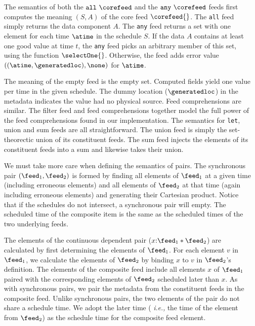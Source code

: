 The semantics of both the $\mathtt{all}\ \corefeed$ and the
$\mathtt{any}\ \corefeed$ feeds first computes the meaning $(S,A)$ of the
core feed $\corefeed{}$.  The \texttt{all} feed simply returns the
data component $A$.  The \texttt{any} feed returns a set with one
element for each time $\atime$ in the schedule $S$.  If the data $A$
contains at least one good value at time $t$, the \texttt{any} feed
picks an arbitrary member of this set, using the function
$\selectOne{}$.  Otherwise, the feed adds  
error value $((\atime,\generatedloc), \none)$ for $\atime$.

The meaning of the empty feed is the empty set.  Computed fields yield
one value per time in the given schedule.  The dummy location
($\generatedloc$) in the metadata indicates the value had no physical
source.  Feed comprehensions are similar.  The filter feed and feed
comprehensions together model the full power of the feed
comprehensions found in our implementation. The semantics for
\texttt{let}, union and sum feeds are all straightforward.  The union
feed is simply the set-theorectic union of its constituent feeds.  The
sum feed injects the elements of its constituent feeds into a sum and
likewise takes their union.

We must take more care when defining the semantics of pairs.  The
synchronous pair $(\feed_1,\feed_2)$ is formed by finding all elements
of $\feed_1$ at a given time (including erroneous elements) and all
elements of $\feed_2$ at that time (again including erroneous
elements) and generating their Cartesian product.  Notice that if
the schedules do not intersect, a synchronous pair will empty.
The scheduled time of the composite item is the same as the scheduled
times of the two underlying feeds. 

The elements of the continuous dependent pair ($x{:}\feed_1 *
\feed_2$) are calculated by first determining the elements of
$\feed_1$.  For each element $v$ in $\feed_1$, we calculate the
elements of $\feed_2$ by binding $x$ to $v$ in $\feed_2$'s definition.
The elements of the composite feed include all elements $x$ of
$\feed_1$ paired with the corresponding elements of $\feed_2$
scheduled later than $x$.  As with synchronous pairs, we pair the
metadata from the constituent feeds in the composite feed. Unlike 
synchronous pairs, the two elements of the pair
do not share a schedule time.  We adopt the later time ({\em
  i.e.,} the time of the element from $\feed_2$) as the schedule time
for the composite feed element.


